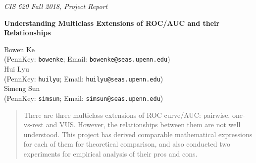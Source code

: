 \documentclass[twoside,11pt]{article}
\renewcommand{\>}{{\rightarrow}}
\newcommand{\1}{{\mathbf 1}}
\newcommand{\0}{{\mathbf 0}}
\begin{document}

\emph{\footnotesize{CIS 620 Fall 2018, Project Report}}

\vspace{12pt}

\begin{center}

\textbf{\Large{Understanding Multiclass Extensions of ROC/AUC and their Relationships}}

\vspace{6pt}

Bowen Ke \\ (PennKey: \texttt{bowenke}; Email: \texttt{bowenke@seas.upenn.edu}) \\[4pt]
Hui Lyu \\ (PennKey: \texttt{huilyu}; Email: \texttt{huilyu@seas.upenn.edu}) \\[4pt]
Simeng Sun \\ (PennKey: \texttt{simsun}; Email: \texttt{simsun@seas.upenn.edu}) 

\end{center}


\begin{abstract}
There are three multiclass extensions of ROC curve/AUC: pairwise, one-vs-rest and VUS. However, the relationships between them are not well understood. This project has derived comparable mathematical expressions for each of them for theoretical comparison, and also conducted two experiments for empirical analysis of their pros and cons. 
\end{abstract}

\vspace{6pt}

\end{document}
